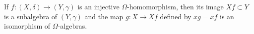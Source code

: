 If $f: (X, \delta) \longrightarrow (Y, \gamma)$ is an injective $\Omega$-homomorphism, then its image $Xf \subset Y$ is a subalgebra of $(Y, \gamma)$ and the map $g: X \longrightarrow Xf$ defined by $xg = xf$ is an isomorphism of $\Omega$-algebras.
